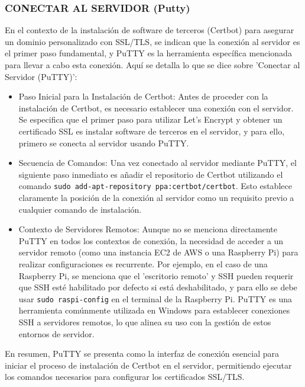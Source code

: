 \documentclass{report}
\begin{document}
\subsubsection{CONECTAR AL SERVIDOR (Putty)}
En el contexto de la instalación de software de terceros (Certbot) para asegurar un dominio personalizado con SSL/TLS, se  
indican que la conexión al servidor es el primer paso fundamental, y PuTTY es la herramienta específica mencionada para llevar 
a cabo esta conexión.
Aquí se detalla lo que se  dice sobre 'Conectar al Servidor (PuTTY)':
\begin{itemize}
    \item Paso Inicial para la Instalación de Certbot: Antes de proceder con la instalación de Certbot, es necesario establecer 
    una conexión con el servidor. Se especifica que el primer paso para utilizar Let's Encrypt y obtener un certificado SSL 
    es instalar software de terceros en el servidor, y para ello, primero se conecta al servidor usando PuTTY.
    \item Secuencia de Comandos: Una vez conectado al servidor mediante PuTTY, el siguiente paso inmediato es añadir el repositorio 
    de Certbot utilizando el comando \verb|sudo add-apt-repository ppa:certbot/certbot|. Esto establece claramente la posición de la conexión 
    al servidor como un requisito previo a cualquier comando de instalación.
    \item Contexto de Servidores Remotos: Aunque no se menciona directamente PuTTY en todos los contextos de conexión, la necesidad de 
    acceder a un servidor remoto (como una instancia EC2 de AWS o una Raspberry Pi) para realizar configuraciones es recurrente. Por ejemplo, 
    en el caso de una Raspberry Pi, se menciona que el 'escritorio remoto' y SSH pueden requerir que SSH esté habilitado por defecto si 
    está deshabilitado, y para ello se debe usar \verb|sudo raspi-config| en el terminal de la Raspberry Pi. PuTTY es una herramienta comúnmente 
    utilizada en Windows para establecer conexiones SSH a servidores remotos, lo que alinea su uso con la gestión de 
    estos entornos de servidor.
\end{itemize}
En resumen, PuTTY se presenta como la interfaz de conexión esencial para iniciar el proceso de instalación de Certbot 
en el servidor, permitiendo ejecutar los comandos necesarios para configurar los certificados SSL/TLS.
\end{document}
